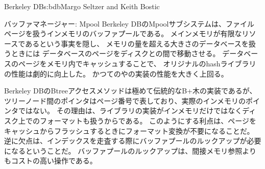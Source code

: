 \begin{aosachapter}{Berkeley DB}{s:bdb}{Margo Seltzer and Keith Bostic}
\begin{aosasect1}{バッファマネージャー: Mpool}
Berkeley DBのMpoolサブシステムは、ファイルページを扱うインメモリのバッファプールである。
メインメモリが有限なリソースであるという事実を隠し、
メモリの量を超える大きさのデータベースを扱うときには
データベースのページをディスクとの間で移動させる。
データベースのページをメモリ内でキャッシュすることで、
オリジナルのhashライブラリの性能は劇的に向上した。
かつてのやの実装の性能を大きく上回る。

Berkeley DBのBtreeアクセスメソッドは極めて伝統的なB+木の実装であるが、
ツリーノード間のポインタはページ番号で表しており、実際のインメモリのポインタではない。
その理由は、ライブラリの実装がインメモリだけではなくディスク上でのフォーマットも扱うからである。
このようにする利点は、ページをキャッシュからフラッシュするときにフォーマット変換が不要になることだ。
逆に欠点は、インデックスを走査する際にバッファプールのルックアップが必要になるということだ。
バッファプールのルックアップは、間接メモリ参照よりもコストの高い操作である。


\end{aosasect1}
\end{aosachapter}
